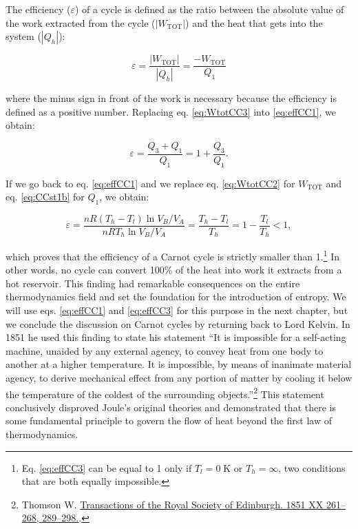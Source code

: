 \documentclass[
]{book}
\theoremstyle{definition}
\theoremstyle{definition}
\theoremstyle{definition}
\theoremstyle{remark}
\begin{document}
The efficiency (\(\varepsilon\)) of a cycle is defined as the ratio between the absolute value of the work extracted from the cycle (\(\left| W_{\text{TOT}} \right|\)) and the heat that gets into the system (\(\left| Q_h \right|\)):

\begin{equation}
\varepsilon = \frac{\left| W_{\text{TOT}} \right|}{\left| Q_h \right|} =\frac{-W_{\text{TOT}}}{Q_1}
\label{eq:effCC1}
\end{equation}

where the minus sign in front of the work is necessary because the efficiency is defined as a positive number. Replacing eq. \eqref{eq:WtotCC3} into \eqref{eq:effCC1}, we obtain:

\begin{equation}
\varepsilon = \frac{Q_3+Q_1}{Q_1} = 1+\frac{Q_3}{Q_1}.
\label{eq:effCC2}
\end{equation}

If we go back to eq. \eqref{eq:effCC1} and we replace eq. \eqref{eq:WtotCC2} for \(W_{\mathrm{TOT}}\) and eq. \eqref{eq:CCst1b} for \(Q_1\), we obtain:

\begin{equation}
\varepsilon = \frac{nR \left( T_h - T_l \right) \ln V_B/V_A}{nRT_h \ln V_B/V_A} = \frac{T_h-T_l}{T_h}=1-\frac{T_l}{T_h }<1,
\label{eq:effCC3}
\end{equation}

which proves that the efficiency of a Carnot cycle is strictly smaller than 1.\footnote{Eq. \eqref{eq:effCC3} can be equal to 1 only if \(T_l=0 \; \text{K}\) or \(T_h=\infty\), two conditions that are both equally impossible.} In other words, no cycle can convert 100\% of the heat into work it extracts from a hot reservoir. This finding had remarkable consequences on the entire thermodynamics field and set the foundation for the introduction of entropy. We will use eqs. \eqref{eq:effCC1} and \eqref{eq:effCC3} for this purpose in the next chapter, but we conclude the discussion on Carnot cycles by returning back to Lord Kelvin. In 1851 he used this finding to state his statement ``It is impossible for a self-acting machine, unaided by any external agency, to convey heat from one body to another at a higher temperature. It is impossible, by means of inanimate material agency, to derive mechanical effect from any portion of matter by cooling it below the temperature of the coldest of the surrounding objects.''\footnote{Thomson W. \href{https://www.biodiversitylibrary.org/item/126047\#page/295/mode/1up}{Transactions of the Royal Society of Edinburgh. 1851 XX 261--268, 289--298.}.} This statement conclusively disproved Joule's original theories and demonstrated that there is some fundamental principle to govern the flow of heat beyond the first law of thermodynamics.
\end{document}
